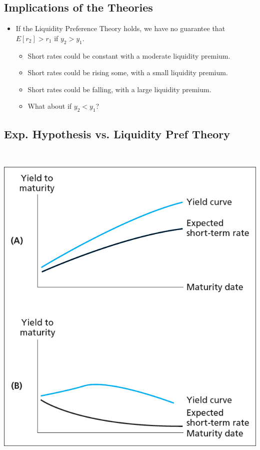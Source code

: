 \documentclass[letterpaper,10pt,english]{sphinxmanual}
\begin{document}
\subsection{Implications of the Theories}
\label{termStructure:id10}\begin{itemize}
\item {} 
If the Liquidity Preference Theory holds, we have no guarantee that
$E[r_2] > r_1$ if $y_2 > y_1$.
\begin{itemize}
\item {} 
Short rates could be constant with a moderate liquidity premium.

\end{itemize}
\begin{itemize}
\item {} 
Short rates could be rising some, with a small liquidity premium.

\end{itemize}
\begin{itemize}
\item {} 
Short rates could be falling, with a large liquidity premium.

\end{itemize}
\begin{itemize}
\item {} 
What about if $y_2 < y_1$?

\end{itemize}

\end{itemize}


\subsection{Exp. Hypothesis vs. Liquidity Pref Theory}
\label{termStructure:exp-hypothesis-vs-liquidity-pref-theory}
$\qquad$

\includegraphics[width=6in]{bod34698_1014_lg.jpg}
\end{document}
